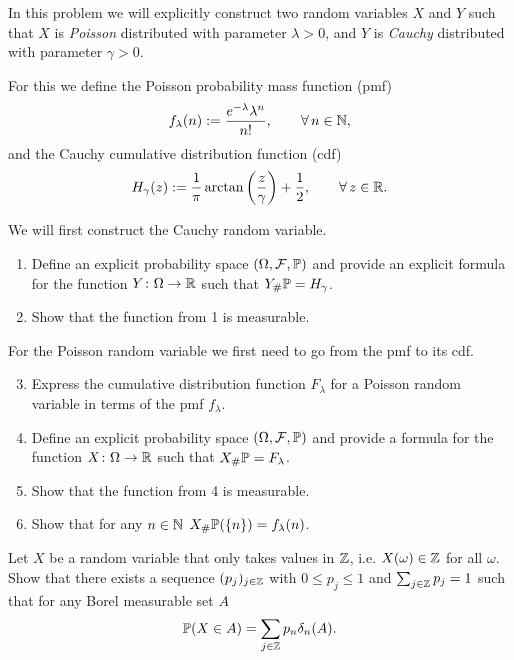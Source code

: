 \begin{problem}
In this problem we will	explicitly construct two random variables $X$ and $Y$ such that $X$ is \emph{Poisson} distributed with parameter $\lambda>0$, and $Y$ is \emph{Cauchy} distributed with parameter $\gamma>0$. 

For this we define the Poisson probability mass function (pmf)
\begin{equation}
	f_\lambda(n) := \frac{e^{-\lambda}\lambda^n}{n!},\qquad \forall\,n\in\mathbb N,
\end{equation}
and the Cauchy cumulative distribution function (cdf)
\begin{equation}
	H_\gamma(z) := \frac{1}{\pi}\arctan\left(\frac{z}{\gamma}\right) + \frac{1}{2},\qquad \forall\,z\in\mathbb R.
\end{equation}

We will first construct the Cauchy random variable.
\begin{enumerate}
\item Define an explicit probability space $(\Omega, \mathcal F, \mathbb P)$ and provide an explicit formula for the function $Y\colon \Omega\to\mathbb R$ such that $Y_\# \mathbb P = H_\gamma$.
\item Show that the function from 1 is measurable.
\end{enumerate}

For the Poisson random variable we first need to go from the pmf to its cdf.
\begin{enumerate}
\setcounter{enumi}{2}
\item Express the cumulative distribution function $F_\lambda$ for a Poisson random variable in terms of the pmf $f_\lambda$.
\item Define an explicit probability space $(\Omega, \mathcal F, \mathbb P)$ and provide a formula for the function $X\colon \Omega\to\mathbb R$ such that $X_\# \mathbb P = F_\lambda$.
\item Show that the function from 4 is measurable.
\item Show that for any $n \in \mathbb N$ $X_\# \mathbb P (\{n\}) = f_\lambda(n)$.
\end{enumerate}

\end{problem}

\begin{problem}\label{prb:discrete_random_variable}
Let $X$ be a random variable that only takes values in $\mathbb Z$, i.e. $X(\omega) \in \mathbb Z$ for all $\omega$. Show that there exists a sequence $(p_j)_{j \in \mathbb Z}$ with $0 \le p_j \le 1$ and $\sum_{j \in \mathbb Z} p_j = 1$ such that for any Borel measurable set $A$
\[
	\mathbb P(X \in A) = \sum_{j \in \mathbb Z} p_n \delta_n(A).
\]
\end{problem}

